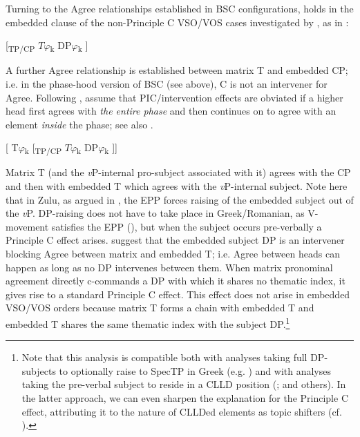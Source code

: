 \documentclass[output=paper]{langsci/langscibook}
\begin{document}
Turning to the Agree relationships established in BSC configurations,  holds in the embedded clause of the non-Principle C VSO\slash VOS cases investigated by \citet{Tsakali2017}, as in :

\ea%
    \label{ex:alexiadou:31}
     \textsubscript{} [\textsubscript{TP/CP}    $T\varphi $\textsubscript{k}    DP$\varphi $\textsubscript{k}  ] 
\z
       

A further Agree relationship is established between matrix T and embedded CP; i.e. in the phase-hood version of BSC (see above), C is not an intervener for Agree. Following \citet{Rackowski2005}, \citet{Tsakali2017} assume that PIC\slash intervention effects are obviated if a higher head first agrees with \textit{the entire phase} and then continues on to agree with an element \textit{inside} the phase; see also \citet{Halpert2016}. 

\ea%
    \label{ex:alexiadou:32}
    [   T$\varphi $\textsubscript{k} [\textsubscript{TP/CP}    $T\varphi $\textsubscript{k}    DP$\varphi $\textsubscript{k}  ]]      
\z
    
Matrix T (and the \textit{v}P-internal pro-subject associated with it) agrees with the CP and then with embedded T which agrees with the \textit{v}P-internal subject. Note here that in Zulu, as argued in \citet{Halpert2016}, the EPP forces raising of the embedded subject out of the \textit{v}P. DP-raising does not have to take place in Greek\slash Romanian, as V-movement satisfies the EPP (\citealt{Alexiadou1998}), but when the subject occurs pre-verbally a Principle C effect arises. \citet{Tsakali2017} suggest that the embedded subject DP is an intervener blocking Agree between matrix and embedded T; i.e. Agree between heads can happen as long as no DP intervenes between them. When matrix pronominal agreement directly c-commands a DP with which it shares no thematic index, it gives rise to a standard Principle C effect. This effect does not arise in embedded VSO\slash VOS orders because matrix T forms a chain with embedded T and embedded T shares the same thematic index with the subject DP.\footnote{Note that this analysis is compatible both with analyses taking full DP-subjects to optionally raise to SpecTP in Greek (e.g. \citealt{Spyropoulos2009}) and with analyses taking the pre-verbal subject to reside in a CLLD position (\citealt{Alexiadou1998}; \citealt{Barbosa2009} and others). In the latter approach, we can even sharpen the explanation for the Principle C effect, attributing it to the nature of CLLDed elements as topic shifters (cf. \citealt{Frascarelli2007}).}   
\end{document}
